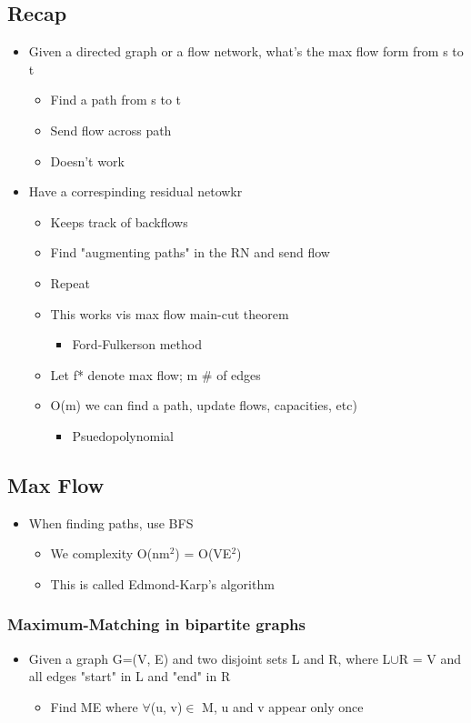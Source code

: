 \documentclass[11pt]{article}
\begin{document}
\subsection*{Recap}
\label{sec:org09554cc}
\begin{itemize}
\item Given a directed graph or a flow network, what's the max flow form from s to t
\begin{itemize}
\item Find a path from s to t
\item Send flow across path
\item Doesn't work
\end{itemize}
\item Have a correspinding residual netowkr
\begin{itemize}
\item Keeps track of backflows
\item Find "augmenting paths" in the RN and send flow
\item Repeat
\item This works vis max flow main-cut theorem
\begin{itemize}
\item Ford-Fulkerson method
\end{itemize}
\item Let f* denote max flow; m \# of edges
\item O(m) we can find a path, update flows, capacities, etc)
\begin{itemize}
\item Psuedopolynomial
\end{itemize}
\end{itemize}
\end{itemize}
\subsection*{Max Flow}
\label{sec:orge81cefc}
\begin{itemize}
\item When finding paths, use BFS
\begin{itemize}
\item We complexity O(nm\(^{\text{2}}\)) = O(VE\(^{\text{2}}\))
\item This is called Edmond-Karp's algorithm
\end{itemize}
\end{itemize}
\subsubsection*{Maximum-Matching in bipartite graphs}
\label{sec:orga14c08d}
\begin{itemize}
\item Given a graph G=(V, E) and two disjoint sets L and R, where L\(\cup\)R = V and all edges "start" in L and "end" in R
\begin{itemize}
\item Find M\subseteq{}E where \(\forall\)(u, v)\(\in\) M, u and v appear only once
\end{itemize}
\end{itemize}
\end{document}

